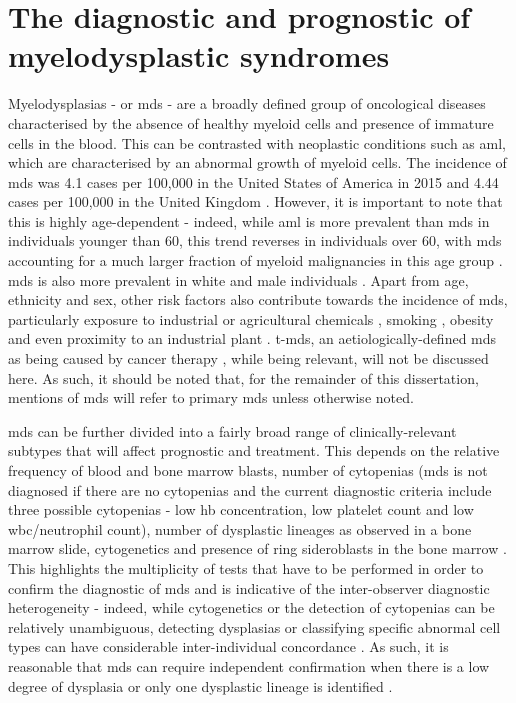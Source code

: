 \section{The diagnostic and prognostic of myelodysplastic syndromes}

Myelodysplasias - or \ac{mds} - are a broadly defined group of oncological diseases characterised by the absence of healthy myeloid cells and presence of immature cells in the blood. This can be contrasted with neoplastic conditions such as \ac{aml}, which are characterised by an abnormal growth of myeloid cells. The incidence of \ac{mds} was 4.1 cases per 100,000 in the United States of America in 2015 \cite{Zeidan2019-jj} and 4.44 cases per 100,000 in the United Kingdom \cite{Roman2016-ad}. However, it is important to note that this is highly age-dependent - indeed, while \ac{aml} is more prevalent than \ac{mds} in individuals younger than 60, this trend reverses in individuals over 60, with \ac{mds} accounting for a much larger fraction of myeloid malignancies in this age group \cite{Zeidan2019-jj}. \ac{mds} is also more prevalent in white and male individuals \cite{Zeidan2019-jj}. Apart from age, ethnicity and sex, other risk factors also contribute towards the incidence of \ac{mds}, particularly exposure to industrial or agricultural chemicals \cite{Nisse2001-qf,Lv2011-iv,Strom2005-pq}, smoking \cite{Lv2011-iv,Strom2005-pq}, obesity \cite{Ma2009-ws} and even proximity to an industrial plant \cite{Nisse2001-qf}. \Ac{t-mds}, an aetiologically-defined \ac{mds} as being caused by cancer therapy \cite{Kuendgen2021-in}, while being relevant, will not be discussed here. As such, it should be noted that, for the remainder of this dissertation, mentions of \ac{mds} will refer to primary \ac{mds} unless otherwise noted.

\ac{mds} can be further divided into a fairly broad range of clinically-relevant subtypes that will affect prognostic and treatment. This depends on the relative frequency of blood and bone marrow blasts, number of cytopenias (\ac{mds} is not diagnosed if there are no cytopenias and the current diagnostic criteria include three possible cytopenias - low \ac{hb} concentration, low platelet count and low \ac{wbc}/neutrophil count), number of dysplastic lineages as observed in a bone marrow slide, cytogenetics and presence of ring sideroblasts in the bone marrow \cite{Arber2016-os}. This highlights the multiplicity of tests that have to be performed in order to confirm the diagnostic of \ac{mds} and is indicative of the inter-observer diagnostic heterogeneity - indeed, while cytogenetics or the detection of cytopenias can be relatively unambiguous, detecting dysplasias or classifying specific abnormal cell types can have considerable inter-individual concordance \cite{Font2013-lx, Parmentier2012-wm, Della_Porta2015-hw}. As such, it is reasonable that \ac{mds} can require independent confirmation when there is a low degree of dysplasia or only one dysplastic lineage is identified \cite{Arber2016-os}.


